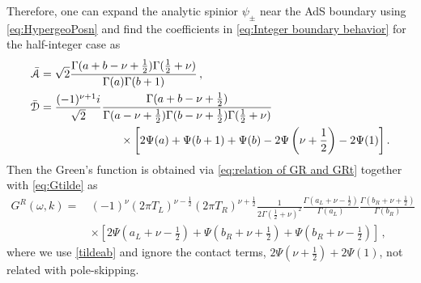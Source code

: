\documentclass[11pt,a4paper]{article}
\begin{document}
Therefore, one can expand the analytic spinior $\psi_{\pm}$ near the AdS boundary using \eqref{eq:HypergeoPosn} and find the coefficients in \eqref{eq:Integer boundary behavior} for the half-integer case as
\begin{equation}\label{FRAD2}
\begin{aligned}
    \bar{\mathcal{A}} & = \sqrt{2}\frac{\Gamma(a+b-\nu+\frac{1}{2}) \Gamma(\frac{1}{2}+\nu)}{\Gamma(a) \Gamma(b+1)}\,, \\
    \bar{\mathcal{D}} & = \frac{(-1)^{\nu+1} i}{\sqrt{2}} \frac{\Gamma(a + b -\nu +\frac{1}{2})}{\Gamma(a-\nu +\frac{1}{2}) \Gamma( b -\nu + \frac{1}{2}) \Gamma(\frac{1}{2}+\nu) }\\
    & \hspace{2.5cm} \times \bigg[ 2\Psi(a) + \Psi(b+1) + \Psi(b) - 2\Psi\left(\nu+\frac{1}{2}\right) - 2\Psi(1) \bigg]\,.
\end{aligned}
\end{equation}
Then the Green's function is obtained via \eqref{eq:relation of GR and GRt} together with \eqref{eq:Gtilde} as
\begin{equation} \label{eq:Fermionic GR Int Finite T}
\begin{split}
     {G}^R(\omega, k) =\, & (-1)^\nu (2\pi T_L)^{\nu-\frac{1}{2}} (2\pi T_R)^{\nu+\frac{1}{2}} \frac{1}{2\Gamma(\frac{1}{2}+\nu)^2} \frac{\Gamma({a}_L+\nu-\frac{1}{2})}{\Gamma({a}_L)}\frac{\Gamma({b}_R+\nu+\frac{1}{2})}{\Gamma({b}_R)}\\
     & \times \left[2 \Psi\left({a}_L+\nu-\frac{1}{2}\right) +\Psi\left({b}_R+\nu+\frac{1}{2}\right) +\Psi\left({b}_R+\nu-\frac{1}{2}\right) \right]\,,
\end{split}
\end{equation}
where we use \eqref{tildeab} and ignore the contact terms, $2\Psi\left(\nu+\frac{1}{2}\right)+2\Psi(1)$, not related with pole-skipping.\\
\end{document}
